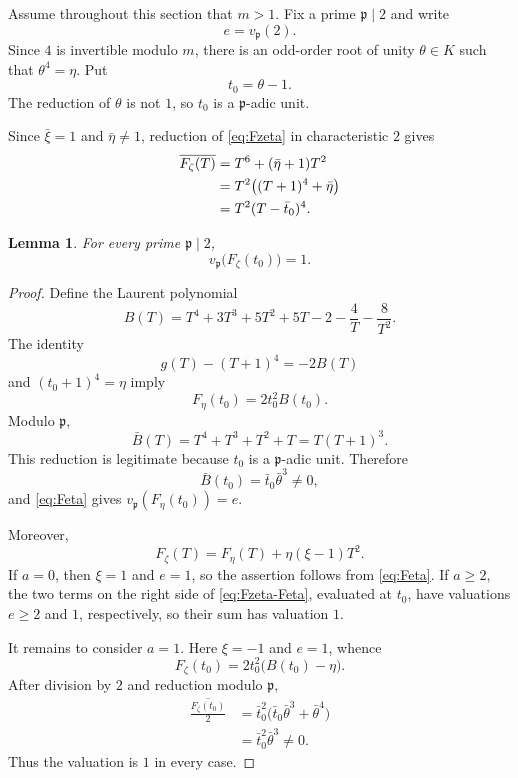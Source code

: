 \documentclass[11pt]{article}
\newtheorem{lemma}[theorem]{Lemma}
\begin{document}
Assume throughout this section that $m>1$.  Fix a prime
$\mathfrak p\mid2$ and write
\[
 e=v_{\mathfrak p}(2).
\]
Since $4$ is invertible modulo $m$, there is an odd-order root of unity
$\theta\in K$ such that $\theta^4=\eta$.  Put
\[
 t_0=\theta-1.
\]
The reduction of $\theta$ is not $1$, so $t_0$ is a
$\mathfrak p$-adic unit.

Since $\bar\xi=1$ and $\bar\eta\neq1$, reduction of
\eqref{eq:Fzeta} in characteristic $2$ gives
\begin{align}
 \overline{F_\zeta(T)}
 &=T^6+(\bar\eta+1)T^2 \notag\\
 &=T^2\bigl((T+1)^4+\bar\eta\bigr) \notag\\
 &=T^2(T-\bar t_0)^4.
 \label{eq:odd-reduction}
\end{align}

\begin{lemma}\label{lem:t0-valuation}
For every prime $\mathfrak p\mid2$,
\[
 v_{\mathfrak p}\bigl(F_\zeta(t_0)\bigr)=1.
\]
\end{lemma}

\begin{proof}
Define the Laurent polynomial
\[
 B(T)=T^4+3T^3+5T^2+5T-2-\frac4T-\frac8{T^2}.
\]
The identity
\[
 g(T)-(T+1)^4=-2B(T)
\]
and $(t_0+1)^4=\eta$ imply
\begin{equation}\label{eq:Feta}
 F_\eta(t_0)=2t_0^2B(t_0).
\end{equation}
Modulo $\mathfrak p$,
\[
 \bar B(T)=T^4+T^3+T^2+T=T(T+1)^3.
\]
This reduction is legitimate because $t_0$ is a $\mathfrak p$-adic
unit.  Therefore
\[
 \bar B(t_0)=\bar t_0\bar\theta^3\neq0,
\]
and \eqref{eq:Feta} gives
$v_{\mathfrak p}(F_\eta(t_0))=e$.

Moreover,
\begin{equation}\label{eq:Fzeta-Feta}
 F_\zeta(T)=F_\eta(T)+\eta(\xi-1)T^2.
\end{equation}
If $a=0$, then $\xi=1$ and $e=1$, so the assertion follows from
\eqref{eq:Feta}.  If $a\geq2$, the two terms on the right side of
\eqref{eq:Fzeta-Feta}, evaluated at $t_0$, have valuations $e\geq2$ and
$1$, respectively, so their sum has valuation $1$.

It remains to consider $a=1$.  Here $\xi=-1$ and $e=1$, whence
\[
 F_\zeta(t_0)=2t_0^2\bigl(B(t_0)-\eta\bigr).
\]
After division by $2$ and reduction modulo $\mathfrak p$,
\begin{align*}
 \overline{\frac{F_\zeta(t_0)}2}
 &=\bar t_0^2
   \bigl(\bar t_0\bar\theta^3+\bar\theta^4\bigr)\\
 &=\bar t_0^2\bar\theta^3\neq0.
\end{align*}
Thus the valuation is $1$ in every case.
\end{proof}
\end{document}
